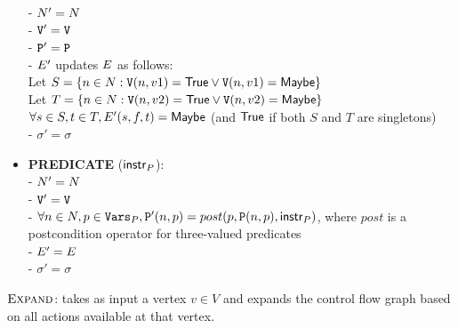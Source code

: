 \begin{itemize}
    - $N' = N$ \\
    - $\mathtt{V}' = \mathtt{V}$ \\
    - $\mathtt{P}' = \mathtt{P}$ \\
    - $E'$ updates $E$ as follows: \\
      \hspace*{1em} Let $S = \{n \in N : \mathtt{V}(n, v1) = \mathsf{True} \vee \mathtt{V}(n, v1) = \mathsf{Maybe}\}$ \\
      \hspace*{1em} Let $T = \{n \in N : \mathtt{V}(n, v2) = \mathsf{True} \vee \mathtt{V}(n, v2) = \mathsf{Maybe}\}$ \\
      \hspace*{1em} $\forall s \in S, t \in T, E'(s,f,t) = \mathsf{Maybe}$ (and $\mathsf{True}$ if both $S$ and $T$ are singletons) \\
    - $\sigma' = \sigma$
  \item \textbf{PREDICATE} ($\mathsf{instr}_P$): \\
    - $N' = N$ \\
    - $\mathtt{V}' = \mathtt{V}$ \\
    - $\forall n \in N, p \in \mathtt{Vars}_P, \mathtt{P}'(n,p) = post(p, \mathtt{P}(n,p), \mathsf{instr}_P)$, where $post$ is a postcondition operator for three-valued predicates \\
    - $E' = E$ \\
    - $\sigma' = \sigma$
\end{itemize}

\begin{algorithm}[ht]


  \caption{$\textsc{Expand}$: takes as input a vertex $v \in V$ and expands the control flow graph based on all actions available at that vertex.}
  \label{alg:heap-expand}
\end{algorithm}


